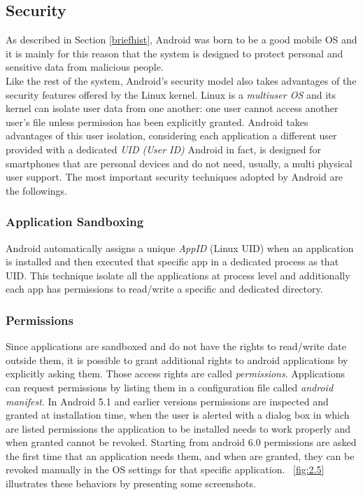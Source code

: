 \subsection{Security}\label{androidsecurity}
\par
As described in Section \ref{briefhist}, Android was born to be a good mobile OS and it is mainly for this reason that the system is designed to protect personal and sensitive data from malicious people.\\
Like the rest of the system, Android's security model also takes advantages of the security features offered by the Linux kernel. Linux is a \textit{multiuser OS} and its kernel can isolate user data from one another: one user cannot access another user's file unless permission has been explicitly granted. Android takes advantages of this user isolation, considering each application a different user provided with a dedicated \textit{UID (User ID)} \cite{elenkov2014android} Android in fact, is designed for smartphones that are personal devices and do not need, usually, a multi physical user support.
The most important security techniques adopted by Android are the followings.

	\subsubsection{Application Sandboxing} Android automatically assigns a unique \textit{AppID} (Linux UID) when an application is installed and then executed that specific app in a dedicated process as that UID. This technique isolate all the applications at process level and additionally each app has permissions to read/write a specific and dedicated directory.
	
	\subsubsection{Permissions} Since applications are sandboxed and do not have the rights to read/write date outside them, it is possible to grant additional rights to android applications by explicitly asking them. Those access rights are called \textit{permissions}. Applications can request permissions by listing them in a configuration file called \textit{android manifest}. In Android 5.1 and earlier versions permissions are inspected and granted at installation time, when the user is alerted with a dialog box in which are listed permissions the application to be installed needs to work properly and when granted cannot be revoked. Starting from android 6.0 permissions are asked the first time that an application needs them, and when are granted, they can be revoked manually in the OS settings for that specific application. \figurename~\ref{fig:2.5} illustrates these behaviors by presenting some screenshots.
	
